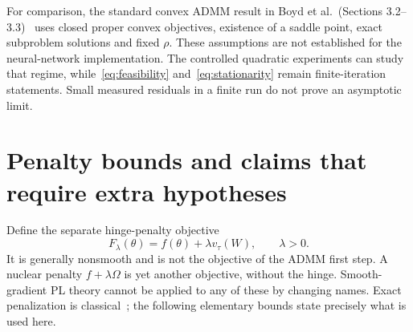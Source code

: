For comparison, the standard convex ADMM result in Boyd et al.\ (Sections 3.2--3.3)~\cite{Boyd2011ADMM} uses closed proper convex objectives, existence of a saddle point, exact subproblem solutions and fixed $\rho$. These assumptions are not established for the neural-network implementation. The controlled quadratic experiments can study that regime, while~\eqref{eq:feasibility} and~\eqref{eq:stationarity} remain finite-iteration statements. Small measured residuals in a finite run do not prove an asymptotic limit.

\section{Penalty bounds and claims that require extra hypotheses}\label{sec:penalty}
Define the separate hinge-penalty objective
\[
 F_\lambda(\theta)=f(\theta)+\lambda v_\tau(W),\qquad\lambda>0.
\]
It is generally nonsmooth and is not the objective of the ADMM first step. A nuclear penalty $f+\lambda\Omega$ is yet another objective, without the hinge. Smooth-gradient PL theory cannot be applied to any of these by changing names. Exact penalization is classical~\cite{HanMangasarian1979}; the following elementary bounds state precisely what is used here.

